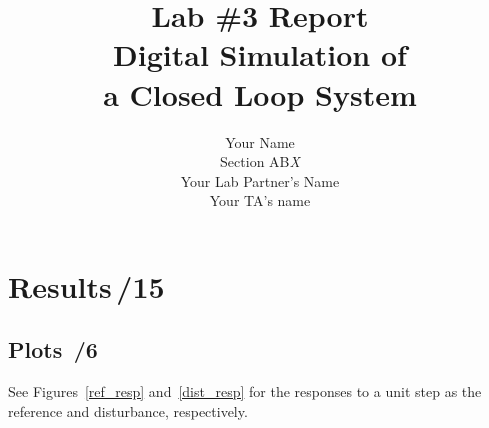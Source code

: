 \documentclass{article}
\newcommand{\score}{\hfill \underline{\hspace{0.65cm}}\,/} %
\begin{document}
%
\title{\bf Lab \#3 Report\\{\sc Digital Simulation of \\ a Closed Loop System}}
\author{Your Name\\ Section AB\emph{X}\\
Your Lab Partner's Name\\
Your TA's name}
\maketitle
\noindent {}
\section{{\sc Results}\score 15}
\subsection{Plots \score 6}
See Figures~\ref{ref_resp} and~\ref{dist_resp} for the responses to a unit step as the reference and disturbance, respectively.

\end{document}
